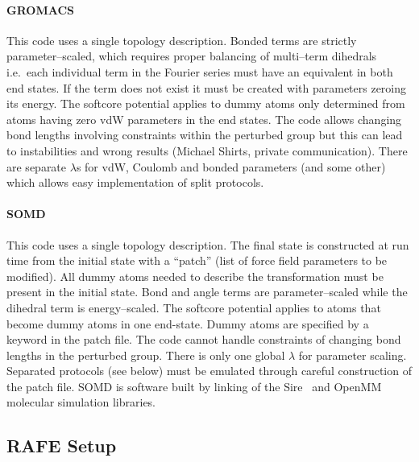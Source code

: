 \documentclass[journal=jctcce,manuscript=article]{achemso}
\begin{document}
\paragraph{GROMACS} This code uses a single topology description.
Bonded terms are strictly parameter--scaled, which requires proper
balancing of multi--term dihedrals i.e.\ each individual term in the Fourier 
series must have an equivalent in both end states.  If the term does not exist 
it must be created with parameters zeroing its energy.
The softcore potential applies to dummy 
atoms only determined from atoms having zero vdW parameters in the end states.
The code allows changing bond lengths involving constraints within the perturbed group  but this can lead to instabilities and wrong results (Michael Shirts, private communication).  There are separate $\lambda$s for vdW,
Coulomb and bonded parameters (and some other) which allows easy implementation 
of split protocols.

\paragraph{SOMD} This code uses a single topology description.
The final state is constructed at run time from the initial state with
a ``patch'' (list of force field parameters to be modified). All dummy atoms
needed to describe the transformation must be present in the initial state. 
Bond and angle terms are parameter--scaled while the dihedral term is
energy--scaled.  The softcore potential applies to atoms that become dummy atoms
 in one end-state. Dummy atoms are specified by a keyword in the patch file.
The code cannot handle constraints of changing bond lengths in the
perturbed group.  There is only one global $\lambda$ for parameter
scaling.  Separated protocols (see below) must be emulated through
careful construction of the patch file.  SOMD is software built by linking of
the Sire~\cite{Sire-2016} and OpenMM~\cite{doi:10.1021/ct300857j} molecular
simulation libraries.


\subsection{RAFE Setup}
\label{sec:rafe_setup}
\end{document}
